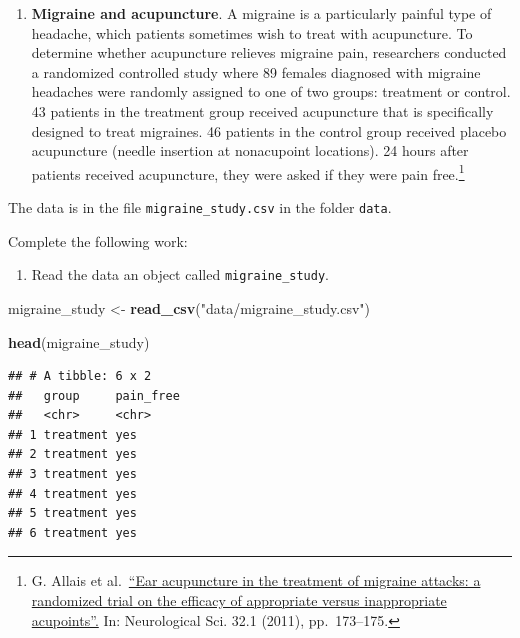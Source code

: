 \documentclass[
]{book}
\newenvironment{Shaded}{\begin{snugshade}}{\end{snugshade}}
\newcommand{\KeywordTok}[1]{\textcolor[rgb]{0.13,0.29,0.53}{\textbf{#1}}}
\newcommand{\NormalTok}[1]{#1}
\newcommand{\StringTok}[1]{\textcolor[rgb]{0.31,0.60,0.02}{#1}}
\providecommand{\tightlist}{%
  \setlength{\itemsep}{0pt}\setlength{\parskip}{0pt}}
\begin{document}
\begin{enumerate}
\def\labelenumi{\arabic{enumi}.}
\setcounter{enumi}{1}
\tightlist
\item
  \textbf{Migraine and acupuncture}. A migraine is a particularly painful type of headache, which patients sometimes wish to treat with acupuncture. To determine whether acupuncture relieves migraine pain, researchers conducted a randomized controlled study where 89 females diagnosed with migraine headaches were randomly assigned to one of two groups: treatment or control. 43 patients in the treatment group received acupuncture that is specifically designed to treat migraines. 46 patients in the control group received placebo acupuncture (needle insertion at nonacupoint locations). 24 hours after patients received acupuncture, they were asked if they were pain free.\footnote{G. Allais et al.~\href{http://www.ncbi.nlm.nih.gov/pubmed/21533739}{``Ear acupuncture in the treatment of migraine attacks: a randomized trial on the efficacy of appropriate versus inappropriate acupoints''.} In: Neurological Sci. 32.1 (2011), pp.~173--175.}
\end{enumerate}

The data is in the file \texttt{migraine\_study.csv} in the folder \texttt{data}.

Complete the following work:

\begin{enumerate}
\def\labelenumi{\alph{enumi}.}
\tightlist
\item
  Read the data an object called \texttt{migraine\_study}.
\end{enumerate}

\begin{Shaded}
\begin{Highlighting}[]
\NormalTok{migraine_study <-}\StringTok{ }\KeywordTok{read_csv}\NormalTok{(}\StringTok{"data/migraine_study.csv"}\NormalTok{)}
\end{Highlighting}
\end{Shaded}

\begin{Shaded}
\begin{Highlighting}[]
\KeywordTok{head}\NormalTok{(migraine_study)}
\end{Highlighting}
\end{Shaded}

\begin{verbatim}
## # A tibble: 6 x 2
##   group     pain_free
##   <chr>     <chr>    
## 1 treatment yes      
## 2 treatment yes      
## 3 treatment yes      
## 4 treatment yes      
## 5 treatment yes      
## 6 treatment yes
\end{verbatim}
\end{document}
